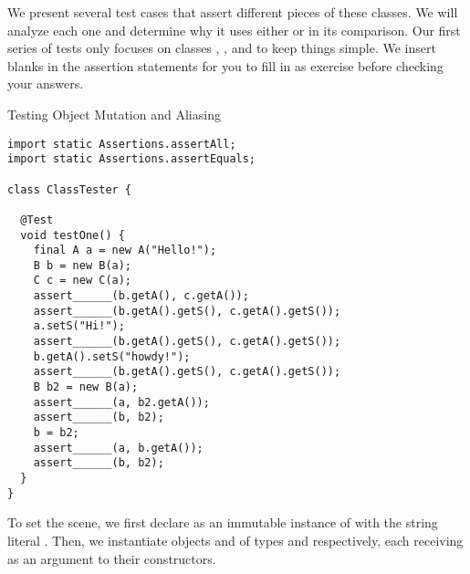 
We present several test cases that assert different pieces of these classes. We will analyze each one and determine why it uses either  or  in its comparison. Our first series of tests only focuses on classes , , and  to keep things simple. We insert blanks in the assertion statements for you to fill in as exercise before checking your answers.

\begin{cl}[]{Testing Object Mutation and Aliasing}
\begin{lstlisting}[language=MyJava]
import static Assertions.assertAll;
import static Assertions.assertEquals;

class ClassTester {

  @Test
  void testOne() {
    final A a = new A("Hello!");
    B b = new B(a);
    C c = new C(a);
    assert______(b.getA(), c.getA());
    assert______(b.getA().getS(), c.getA().getS());
    a.setS("Hi!");
    assert______(b.getA().getS(), c.getA().getS());
    b.getA().setS("howdy!");
    assert______(b.getA().getS(), c.getA().getS());
    B b2 = new B(a);
    assert______(a, b2.getA());
    assert______(b, b2);
    b = b2;
    assert______(a, b.getA());
    assert______(b, b2);
  }
}
\end{lstlisting}
\end{cl}

To set the scene, we first declare  as an immutable instance of  with the string literal . Then, we instantiate objects  and  of types  and  respectively, each receiving  as an argument to their constructors. 

